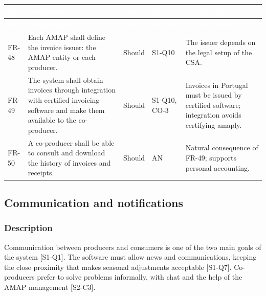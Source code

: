 \documentclass[11pt,a4paper]{article}
\begin{document}
{\footnotesize
\begin{longtable}{>{\raggedright\arraybackslash\hspace{0pt}}p{}>{\raggedright\arraybackslash\hspace{0pt}}p{}>{\raggedright\arraybackslash\hspace{0pt}}p{}>{\raggedright\arraybackslash\hspace{0pt}}p{}>{\raggedright\arraybackslash\hspace{0pt}}p{}}
\rowcolor{hdr}\textcolor{white}{\textbf{ID}} & \textcolor{white}{\textbf{Requirement}} & \textcolor{white}{\textbf{Prio.}} & \textcolor{white}{\textbf{Source}} & \textcolor{white}{\textbf{Justification}} \\ \endfirsthead
\rowcolor{hdr}\textcolor{white}{\textbf{ID}} & \textcolor{white}{\textbf{Requirement}} & \textcolor{white}{\textbf{Prio.}} & \textcolor{white}{\textbf{Source}} & \textcolor{white}{\textbf{Justification}} \\ \endhead
FR-48 & Each AMAP shall define the invoice issuer: the AMAP entity or each producer. & Should & S1-Q10 & The issuer depends on the legal setup of the CSA. \\ \hline
FR-49 & The system shall obtain invoices through integration with certified invoicing software and make them available to the co-producer. & Should & S1-Q10, CO-3 & Invoices in Portugal must be issued by certified software; integration avoids certifying amaply. \\ \hline
FR-50 & A co-producer shall be able to consult and download the history of invoices and receipts. & Should & AN & Natural consequence of FR-49; supports personal accounting. \\ \hline
\end{longtable}}
\addtocounter{table}{-1}

\subsection{Communication and notifications}


\subsubsection{Description}

Communication between producers and consumers is one of the two main goals of the system [S1-Q1]. The software must allow news and communications, keeping the close proximity that makes seasonal adjustments acceptable [S1-Q7]. Co-producers prefer to solve problems informally, with chat and the help of the AMAP management [S2-C3].
\end{document}
